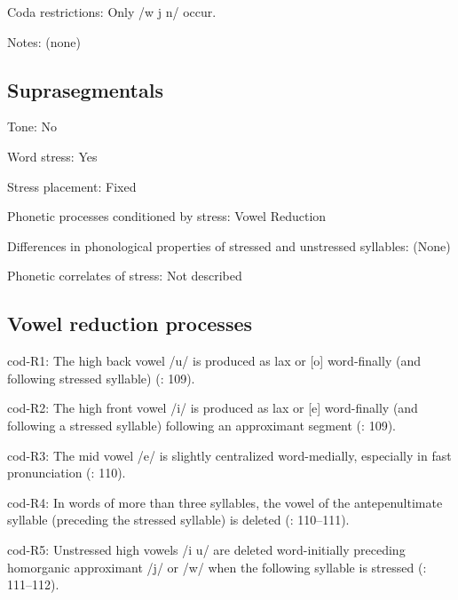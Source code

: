 {\begin{appendixdesc}
\item[Coda restrictions:] Only /w j n/ occur.

\item[Notes:] (none)
\end{appendixdesc}
\subsection*{Suprasegmentals}
\begin{appendixdesc}
\item[Tone:] No

\item[Word stress:] Yes

\item[Stress placement:] Fixed

\item[Phonetic processes conditioned by stress:] Vowel Reduction

\item[Differences in phonological properties of stressed and unstressed syllables:] (None)

\item[Phonetic correlates of stress:] Not described
\end{appendixdesc}
\subsection*{Vowel reduction processes}
\begin{appendixdesc}

\item[cod-R1:] The high back vowel /u/ is produced as lax or [o] word-finally (and following stressed syllable) (\citealt{VallejosYopán2010}: 109).

\item[cod-R2:] The high front vowel /i/ is produced as lax or [e] word-finally (and following a stressed syllable) following an approximant segment (\citealt{VallejosYopán2010}: 109).

\item[cod-R3:] The mid vowel /e/ is slightly centralized word-medially, especially in fast pronunciation (\citealt{VallejosYopán2010}: 110).

\item[cod-R4:] In words of more than three syllables, the vowel of the antepenultimate syllable (preceding the stressed syllable) is deleted (\citealt{VallejosYopán2010}: 110--111).

\item[cod-R5:] Unstressed high vowels /i u/ are deleted word-initially preceding homorganic approximant /j/ or /w/ when the following syllable is stressed (\citealt{VallejosYopán2010}: 111--112).
\end{appendixdesc}
}
